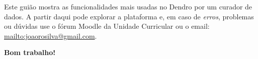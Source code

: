 \documentclass[paper=a4, fontsize=11pt]{scrartcl} %
\numberwithin{equation}{section} %
\numberwithin{figure}{section} %
\numberwithin{table}{section} %
\begin{document}
%
%
%
%

\vspace*{\fill}
\begin{center}
\begin{minipage}{.6\textwidth}
Este guião mostra as funcionalidades mais usadas no Dendro por um curador de dados. A partir daqui pode explorar a plataforma e, em caso de \emph{erros}, problemas ou dúvidas use o fórum Moodle da Unidade Curricular ou o email:\\\url{mailto:joaorosilva@gmail.com}. 

\textbf{Bom trabalho!}


\end{minipage}
\end{center}
\vfill %
\end{document}
